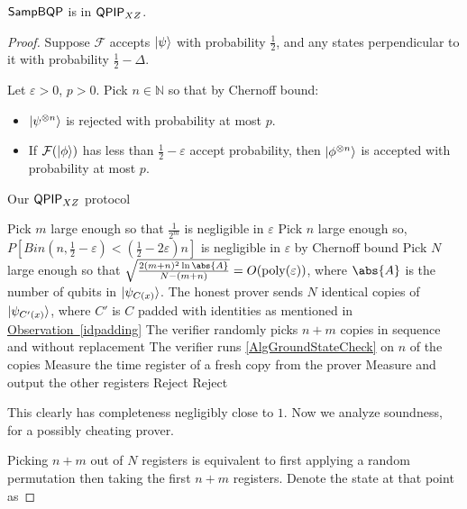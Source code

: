 \begin{theorem}
	$\operatorname{\mathsf{SampBQP}}$ is in $\operatorname{\mathsf{QPIP}}_{XZ}$.
\end{theorem}
\begin{proof}

Suppose $\mathcal{F}$ accepts $\ket{\psi}$ with probability $\frac{1}{2}$, and any states perpendicular to it with probability $\frac{1}{2}-\Delta$.

Let $\varepsilon>0$, $p>0$. Pick $n\in\mathbb{N}$ so that by Chernoff bound:
\begin{itemize}
	\item $\ket{\psi^{\otimes n}}$ is rejected with probability at most $p$.
	\item If $\mathcal{F}(\ket{\phi})$ has less than $\frac{1}{2}-\varepsilon$ accept probability, then $\ket{\phi^{\otimes n}}$ is accepted with probability at most $p$.
\end{itemize}

\begin{algorithm}
	\caption{Our $\operatorname{\mathsf{QPIP}}_{XZ}$ protocol}
	\label{AlgAmp1}
	\begin{algorithmic}[1]
		\State Pick $m$ large enough so that $\frac{1}{2^m}$ is negligible in $\varepsilon$
		\State Pick $n$ large enough so, $P\left[Bin(n, \frac{1}{2}-\varepsilon)<\left(\frac{1}{2}-2\varepsilon\right)n\right]$ is negligible in $\varepsilon$ by Chernoff bound
		\State Pick $N$ large enough so that $\sqrt{\frac{2(m+n)^2\ln\abs{A}}{N-(m+n)}}=O(\poly(\varepsilon))$, where $\abs{A}$ is the number of qubits in $\ket{\psi_{C(x)}}$.
		\State The honest prover sends $N$ identical copies of $\ket{\psi_{C'(x)}}$, where $C'$ is $C$ padded with identities as mentioned in \hyperref[idpadding]{Observation~\ref*{idpadding}}
		\State The verifier randomly picks $n+m$ copies in sequence and without replacement
		\State The verifier runs \autoref{AlgGroundStateCheck} on $n$ of the copies
				\State Measure the time register of a fresh copy from the prover
					\State Measure and output the other registers
				\EndIf
			\EndFor
			\State Reject
		\Else
			\State Reject
		\EndIf
	\end{algorithmic}
\end{algorithm}

This clearly has completeness negligibly close to $1$. Now we analyze soundness, for a possibly cheating prover.

Picking $n+m$ out of $N$ registers is equivalent to first applying a random permutation then taking the first $n+m$ registers. Denote the state at that point as


\end{proof}
